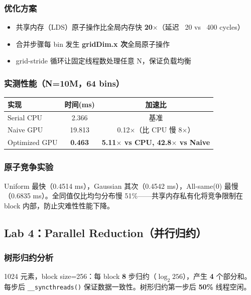 \documentclass[12pt,a4paper]{article}
\newcommand{\ans}[1]{\textcolor{answerblue}{\textbf{#1}}}
\begin{document}
\subsubsection*{优化方案}
\begin{itemize}
    \item 共享内存（LDS）原子操作比全局内存快 \ans{20$\times$}（延迟 ~20 vs ~400 cycles）
    \item 合并步骤每 bin 发生 \ans{gridDim.x 次}全局原子操作
    \item grid-stride 循环让固定线程数处理任意 N，保证负载均衡
\end{itemize}

\subsubsection*{实测性能（N=10M，64 bins）}
\begin{table}[H]
\centering
\begin{tabular}{lcc}
\toprule
实现 & 时间(ms) & 加速比 \\
\midrule
Serial CPU    & 2.366 & 基准 \\
Naive GPU     & 19.813 & 0.12$\times$（比 CPU 慢 8$\times$） \\
Optimized GPU & \ans{0.463} & \ans{5.11$\times$ vs CPU, 42.8$\times$ vs Naive} \\
\bottomrule
\end{tabular}
\end{table}

\subsubsection*{原子竞争实验}
Uniform 最快（0.4514 ms），Gaussian 其次（0.4542 ms），All-same(0) 最慢（0.6835 ms）。全同值仅比均匀分布慢 51\%——共享内存私有化将竞争限制在 block 内部，防止灾难性性能下降。

\subsection{Lab 4：Parallel Reduction（并行归约）}

\subsubsection*{树形归约分析}
1024 元素，block size=256：每 block \ans{8} 步归约（$\log_2 256$），产生 \ans{4} 个部分和。每步后 \texttt{\_\_syncthreads()} 保证数据一致性。树形归约第一步后 \ans{50\%} 线程空闲。
\end{document}
